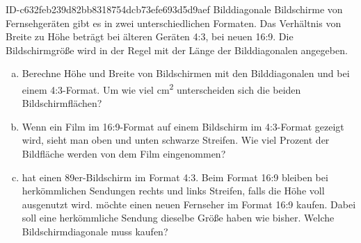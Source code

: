 \begin{exercise}
      {ID-c632feb239d82bb8318754dcb73efe693d5d9aef}
      {Bilddiagonale}
  \ifproblem\problem
    Bildschirme von Fernsehgeräten gibt es in zwei unterschiedlichen Formaten.
    Das Verhältnis von Breite zu Höhe beträgt bei älteren Geräten 4:3, bei
    neuen 16:9. Die Bildschirmgröße wird in der Regel mit der Länge der
    Bilddiagonalen angegeben.
    \begin{enumerate}[a)]
      \item Berechne Höhe und Breite von Bildschirmen mit den Bilddiagonalen
             und  bei einem 4:3-Format. Um wie viel cm\textsuperscript{2}
            unterscheiden sich die beiden Bildschirmflächen?
      \item Wenn ein Film im 16:9-Format auf einem Bildschirm im 4:3-Format gezeigt
            wird, sieht man oben und unten schwarze Streifen. Wie viel Prozent der
            Bildfläche werden von dem Film eingenommen?
      \item \xxa{} hat einen 89er-Bildschirm im Format 4:3. Beim Format 16:9 bleiben
            bei herkömmlichen Sendungen rechts und links Streifen, falls die Höhe
            voll ausgenutzt wird. \xxa{} möchte einen neuen Fernseher im Format
            16:9 kaufen. Dabei soll eine herkömmliche Sendung dieselbe Größe haben
            wie bisher. Welche Bildschirmdiagonale muss \xxa{} kaufen?
    \end{enumerate}
  \fi
\end{exercise}

